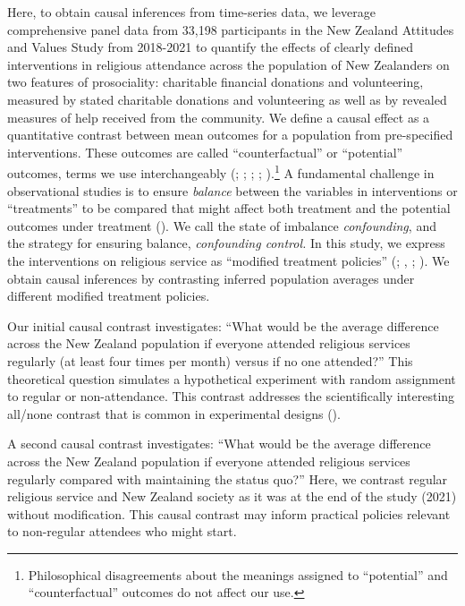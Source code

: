 \documentclass[
  single column]{article}
\begin{document}
Here, to obtain causal inferences from time-series data, we leverage
comprehensive panel data from 33,198 participants in the New Zealand
Attitudes and Values Study from 2018-2021 to quantify the effects of
clearly defined interventions in religious attendance across the
population of New Zealanders on two features of prosociality: charitable
financial donations and volunteering, measured by stated charitable
donations and volunteering as well as by revealed measures of help
received from the community. We define a causal effect as a quantitative
contrast between mean outcomes for a population from pre-specified
interventions. These outcomes are called ``counterfactual'' or
``potential'' outcomes, terms we use interchangeably
(;
;
;
; ).\footnote{Philosophical disagreements about the
  meanings assigned to ``potential'' and ``counterfactual'' outcomes do
  not affect our use.} A fundamental challenge in observational studies
is to ensure \emph{balance} between the variables in interventions or
``treatments'' to be compared that might affect both treatment and the
potential outcomes under treatment (). We call the state of imbalance \emph{confounding},
and the strategy for ensuring balance, \emph{confounding control.} In
this study, we express the interventions on religious service as
``modified treatment policies''
(;
,
; ). We obtain causal inferences by contrasting inferred
population averages under different modified treatment policies.

Our initial causal contrast investigates: ``What would be the average
difference across the New Zealand population if everyone attended
religious services regularly (at least four times per month) versus if
no one attended?'' This theoretical question simulates a hypothetical
experiment with random assignment to regular or non-attendance. This
contrast addresses the scientifically interesting all/none contrast that
is common in experimental designs ().

A second causal contrast investigates: ``What would be the average
difference across the New Zealand population if everyone attended
religious services regularly compared with maintaining the status quo?''
Here, we contrast regular religious service and New Zealand society as
it was at the end of the study (2021) without modification. This causal
contrast may inform practical policies relevant to non-regular attendees
who might start.
\end{document}
